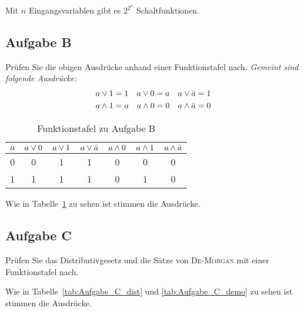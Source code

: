 Mit $n$ Eingangsvariablen gibt es $2^{2^n}$ Schaltfunktionen.

\FloatBarrier
\subsection{Aufgabe B}

\begin{problem}
    Prüfen Sie die obigen Ausdrücke anhand einer Funktionstafel nach.
    \textit{Gemeint sind folgende Ausdrücke:}
        \begin{align*}
            a \vee 1 &= 1 \quad a \vee 0 = a \quad a \vee \bar a = 1\\
            a \wedge 1 &= a \quad a \wedge 0 = 0 \quad a \wedge \bar a = 0
        \end{align*}
\end{problem}

\begin{table}
    \centering
    \begin{tabular}{c|cccccc}
        $a$ & $a \vee 0$ & $a \vee 1$ & $a \vee \bar a$ & $a \wedge 0$ & $a
        \wedge 1$ & $a \wedge \bar a$ \\
        \hline
        0 & 0 & 1 & 1 & 0 & 0 & 0\\
        1 & 1 & 1 & 1 & 0 & 1 & 0
    \end{tabular}
    \caption{%
        Funktionstafel zu Aufgabe B
    }
    \label{tab:Aufgabe_B}
\end{table}

Wie in Tabelle~\ref{tab:Aufgabe_B} zu sehen ist stimmen die Ausdrücke.

\FloatBarrier
\subsection{Aufgabe C}

\begin{problem}
    Prüfen Sie das Distributivgesetz und die Sätze von \textsc{De-Morgan} mit einer
    Funktionstafel nach.
\end{problem}

Wie in Tabelle~\ref{tab:Aufgabe_C_dist} und \ref{tab:Aufgabe_C_demo} zu sehen
ist stimmen die Ausdrücke.

